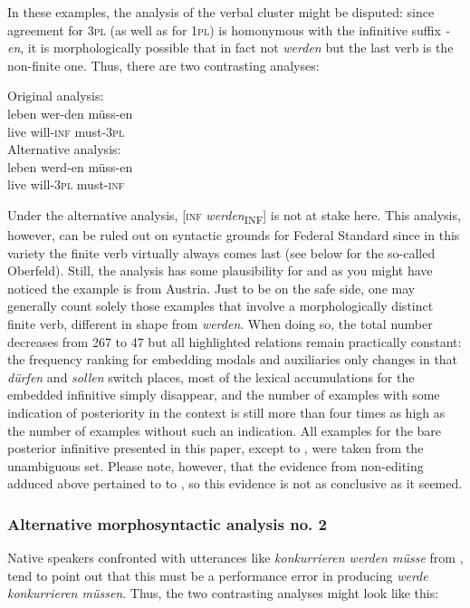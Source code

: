 \documentclass[output=paper,hidelinks]{langscibook}
\begin{document}
In these examples, the analysis of the verbal cluster might be disputed: since agreement for \textsc{3pl} (as well as for \textsc{1pl}) is homonymous with the infinitive suffix \emph{-en}, it is morphologically possible that in fact not \emph{werden} but the last verb is the non-finite one. Thus, there are two contrasting analyses:

\ea
\ea Original analysis:\\
\gll leben wer-den müss-en\\
     live will-\textsc{inf} must-3\textsc{pl}\\
\ex Alternative analysis:\\
\gll leben werd-en müss-en\\
    live will-3\textsc{pl} must-\textsc{inf}\\
\z
\z

Under the alternative analysis, [\textsc{inf} \textit{werden}\textsubscript{INF}] is not at stake here. This analysis, however, can be ruled out on syntactic grounds for Federal Standard  since in this variety the finite verb virtually always comes last \citet[4626]{Wurmbrand2017} (see below for the so-called Oberfeld). Still, the analysis has some plausibility for  \citep[281–282]{Patocka1997} and as you might have noticed the example is from Austria. Just to be on the safe side, one may generally count solely those examples that involve a morphologically distinct finite verb, different in shape from \emph{werden}. When doing so, the total number decreases from 267 to 47 but all highlighted relations remain practically constant: the frequency ranking for embedding modals and auxiliaries only changes in that \emph{dürfen} and \emph{sollen} switch places, most of the lexical accumulations for the embedded infinitive simply disappear,  and the number of examples with some indication of posteriority in the context is still more than four times as high as the number of examples without such an indication. All examples for the bare posterior infinitive presented in this paper, except  to , were taken from the unambiguous set. Please note, however, that the evidence from non-editing adduced above pertained to  to , so this evidence is not as conclusive as it seemed.

\subsubsection{Alternative morphosyntactic analysis no. 2}\largerpage[-1]
Native speakers confronted with utterances like \emph{konkurrieren werden müsse} from , tend to point out that this must be a performance error in producing \emph{werde konkurrieren müssen}. Thus, the two contrasting analyses might look like this:
\end{document}
